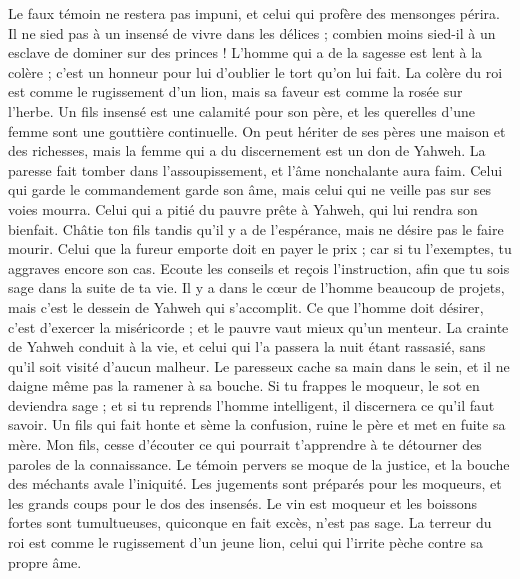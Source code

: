 \begin{multicols}{2}
Le faux témoin ne restera pas impuni, et celui qui profère des mensonges périra.
Il ne sied pas à un insensé de vivre dans les délices ; combien moins sied-il à un esclave de dominer sur des princes !
L'homme qui a de la sagesse est lent à la colère ; c'est un honneur pour lui d’oublier le tort qu'on lui fait.
La colère du roi est comme le rugissement d'un lion, mais sa faveur est comme la rosée sur l'herbe.
Un fils insensé est une calamité pour son père, et les querelles d’une femme sont une gouttière continuelle.
On peut hériter de ses pères une maison et des richesses, mais la femme qui a du discernement est un don de Yahweh.
La paresse fait tomber dans l’assoupissement, et l'âme nonchalante aura faim.
Celui qui garde le commandement garde son âme, mais celui qui ne veille pas sur ses voies mourra.
Celui qui a pitié du pauvre prête à Yahweh, qui lui rendra son bienfait.
Châtie ton fils tandis qu'il y a de l'espérance, mais ne désire pas le faire mourir.
Celui que la fureur emporte doit en payer le prix ; car si tu l'exemptes, tu aggraves encore son cas.
Ecoute les conseils et reçois l'instruction, afin que tu sois sage dans la suite de ta vie.
Il y a dans le cœur de l’homme beaucoup de projets, mais c’est le dessein de Yahweh qui s’accomplit.
Ce que l'homme doit désirer, c'est d'exercer la miséricorde ; et le pauvre vaut mieux qu’un menteur.
La crainte de Yahweh conduit à la vie, et celui qui l'a passera la nuit étant rassasié, sans qu'il soit visité d'aucun malheur.
Le paresseux cache sa main dans le sein, et il ne daigne même pas la ramener à sa bouche.
Si tu frappes le moqueur, le sot en deviendra sage ; et si tu reprends l'homme intelligent, il discernera ce qu'il faut savoir.
Un fils qui fait honte et sème la confusion, ruine le père et met en fuite sa mère.
Mon fils, cesse d’écouter ce qui pourrait t’apprendre à te détourner des paroles de la connaissance.
Le témoin pervers se moque de la justice, et la bouche des méchants avale l'iniquité.
Les jugements sont préparés pour les moqueurs, et les grands coups pour le dos des insensés.
\VerseOne{}Le vin est moqueur et les boissons fortes sont tumultueuses, quiconque en fait excès, n'est pas sage.
La terreur du roi est comme le rugissement d'un jeune lion, celui qui l’irrite pèche contre sa propre âme.

\end{multicols}

